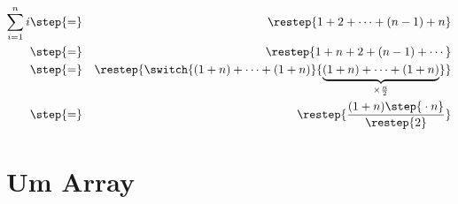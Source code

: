 \documentclass{article}
\begin{document}
\parstepwise
{%
  \begin{eqnarray}
    \sum_{i=1}^{n} i & \step{=} & \restep{1 + 2 + \cdots + (n-1) + n}\\
                     & \step{=} & \restep{1 + n + 2 + (n-1) + \cdots}\\
                     & \step{=} & \restep
                                  {%
                                    \switch
                                    {%
                                      \vphantom{\underbrace{(1 + n) + \cdots + (1 + n)}_{\times\frac{n}{2}}}%
                                      (1 + n) + \cdots + (1 + n)%
                                      }
                                    {\underbrace{(1 + n) + \cdots + (1 + n)}_{\times\frac{n}{2}}}%
                                    }
                                  \\
                     & \step{=} & \restep{\frac{(1 + n)\step{{}\cdot n}}{\restep{2}}}
  \end{eqnarray}
}


\section{Um Array}
\end{document}
